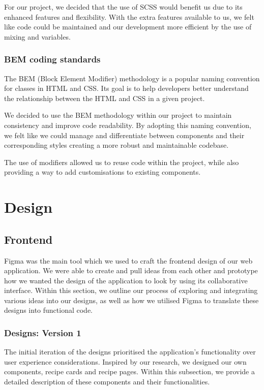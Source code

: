 \documentclass{article}
\begin{document}
For our project, we decided that the use of SCSS would benefit us due to its
enhanced features and flexibility. With the extra features available to us, we
felt like code could be maintained and our development more efficient by the
use of mixing and variables.

\subsubsection{BEM coding standards}
The BEM (Block Element Modifier) methodology is a popular naming convention for
classes in HTML and CSS. Its goal is to help developers better understand the
relationship between the HTML and CSS in a given project.

We decided to use the BEM methodology within our project to maintain
consistency and improve code readability. By adopting this naming convention,
we felt like we could manage and differentiate between components and their
corresponding styles creating a more robust and maintainable codebase.

The use of modifiers allowed us to reuse code within the project, while also
providing a way to add customisations to existing components.

\section{Design}
\subsection{Frontend}
Figma was the main tool which we used to craft the frontend design of our web
application. We were able to create and pull ideas from each other and
prototype how we wanted the design of the application to look by using its
collaborative interface. Within this section, we outline our process of
exploring and integrating various ideas into our designs, as well as how we
utilised Figma to translate these designs into functional code.

\subsubsection{Designs: Version 1}
The initial iteration of the designs prioritised the application's
functionality over user experience considerations. Inspired by our research, we
designed our own components, recipe cards and recipe pages. Within this
subsection, we provide a detailed description of these components and their
functionalities.
\end{document}
